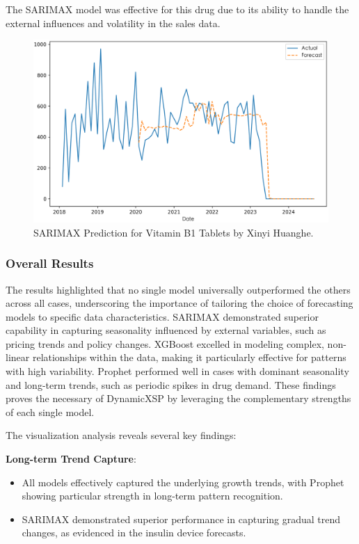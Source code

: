 \documentclass[journal]{IEEEtran}
\begin{document}
\begin{itemize}
The SARIMAX model was effective for this drug due to its ability to handle the external influences and volatility in the sales data.
\begin{figure}[H]
\centering
\includegraphics[width=\linewidth]{../Result_Paper/SARIMAX_Prediction_维生素B1片_信谊黄河.png}
\caption{SARIMAX Prediction for Vitamin B1 Tablets by Xinyi Huanghe.}
\label{fig:vitaminb1}
\end{figure}
\end{itemize}

\subsubsection{Overall Results}

The results highlighted that no single model universally outperformed the others across all cases, underscoring the importance of tailoring the choice of forecasting models to specific data characteristics. SARIMAX demonstrated superior capability in capturing seasonality influenced by external variables, such as pricing trends and policy changes. XGBoost excelled in modeling complex, non-linear relationships within the data, making it particularly effective for patterns with high variability. Prophet performed well in cases with dominant seasonality and long-term trends, such as periodic spikes in drug demand. These findings proves the necessary of DynamicXSP by leveraging the complementary strengths of each single model. 

The visualization analysis reveals several key findings:

\textbf{Long-term Trend Capture}:
\begin{itemize}
\item All models effectively captured the underlying growth trends, with Prophet showing particular strength in long-term pattern recognition.
\item SARIMAX demonstrated superior performance in capturing gradual trend changes, as evidenced in the insulin device forecasts.
\end{itemize}
\end{document}
